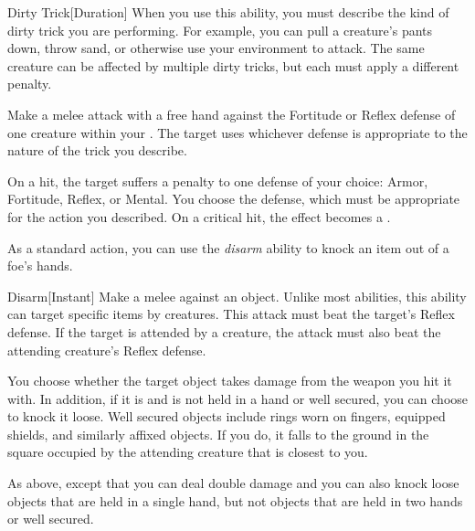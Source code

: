         \begin{durationability}{Dirty Trick}[Duration]
            \rankline
            When you use this ability, you must describe the kind of dirty trick you are performing.
            For example, you can pull a creature's pants down, throw sand, or otherwise use your environment to attack.
            The same creature can be affected by multiple dirty tricks, but each must apply a different penalty.

            Make a melee attack with a free hand against the Fortitude or Reflex defense of one creature within your .
            The target uses whichever defense is appropriate to the nature of the trick you describe.

            On a hit, the target  suffers a  penalty to one defense of your choice: Armor, Fortitude, Reflex, or Mental.
            You choose the defense, which must be appropriate for the action you described.
            On a critical hit, the effect becomes a .
        \end{durationability}

        \label{Disarm} As a standard action, you can use the \textit{disarm} ability to knock an item out of a foe's hands.

        \begin{instantability}{Disarm}[Instant]
            \rankline
            Make a melee  against an object.
            Unlike most abilities, this ability can target specific items  by creatures.
            This attack must beat the target's Reflex defense.
            If the target is attended by a creature, the attack must also beat the attending creature's Reflex defense.

            \hit You choose whether the target object takes damage from the weapon you hit it with.
            In addition, if it is  and is not held in a hand or well secured, you can choose to knock it loose.
            Well secured objects include rings worn on fingers, equipped shields, and similarly affixed objects.
            If you do, it falls to the ground in the square occupied by the attending creature that is closest to you.

            \crit As above, except that you can deal double damage and you can also knock loose objects that are held in a single hand, but not objects that are held in two hands or well secured.
        \end{instantability}

